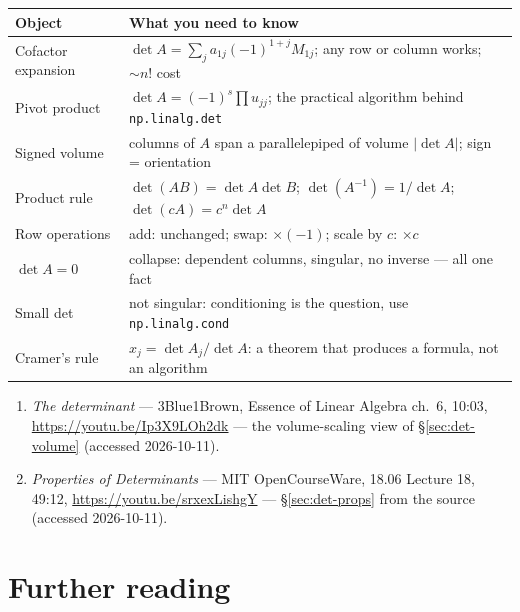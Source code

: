 \begin{center}
\begin{tabularx}{\textwidth}{l>{\raggedright\arraybackslash}X}
\toprule
\textbf{Object} & \textbf{What you need to know}\\
\midrule
Cofactor expansion & $\det A=\sum_j a_{1j}(-1)^{1+j}M_{1j}$; any row or
column works; $\sim n!$ cost \\
Pivot product & $\det A=(-1)^{s}\prod u_{jj}$; the practical algorithm
behind \texttt{np.linalg.det} \\
Signed volume & columns of $A$ span a parallelepiped of volume $|\det A|$;
sign = orientation \\
Product rule & $\det(AB)=\det A\det B$; $\det(A^{-1})=1/\det A$;
$\det(cA)=c^{n}\det A$ \\
Row operations & add: unchanged; swap: $\times(-1)$; scale by $c$:
$\times c$ \\
$\det A=0$ & collapse: dependent columns, singular, no inverse --- all one
fact \\
Small det & not singular: conditioning is the question, use
\texttt{np.linalg.cond} \\
Cramer's rule & $x_j=\det A_j/\det A$: a theorem that produces a formula,
not an algorithm \\
\bottomrule
\end{tabularx}
\end{center}
\begin{rulebox}
\begin{enumerate}
\item \emph{The determinant} --- 3Blue1Brown, Essence of Linear
Algebra ch.~6, 10:03, \url{https://youtu.be/Ip3X9LOh2dk} --- the
volume-scaling view of \S\ref{sec:det-volume} (accessed 2026-10-11).
\item \emph{Properties of Determinants} --- MIT OpenCourseWare, 18.06
Lecture 18, 49:12, \url{https://youtu.be/srxexLishgY} ---
\S\ref{sec:det-props} from the source (accessed 2026-10-11).
\end{enumerate}
\end{rulebox}

\section*{Further reading}

